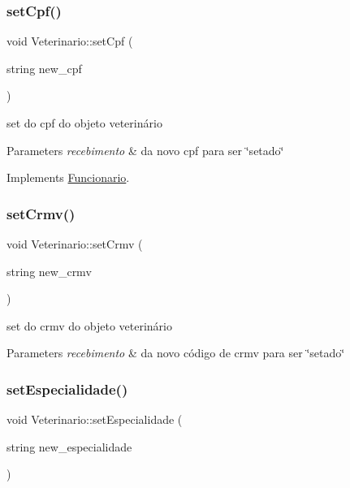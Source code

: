 \subsubsection{\texorpdfstring{setCpf()}{setCpf()}}
{\footnotesize\ttfamily void Veterinario\+::set\+Cpf (\begin{DoxyParamCaption}\item[{string}]{new\+\_\+cpf }\end{DoxyParamCaption})\hspace{0.3cm}{\ttfamily [virtual]}}



set do cpf do objeto veterinário 


\begin{DoxyParams}{Parameters}
{\em recebimento} & da novo cpf para ser \char`\"{}setado\char`\"{} \\
\hline
\end{DoxyParams}


Implements \mbox{\hyperlink{class_funcionario}{Funcionario}}.

\mbox{\label{class_veterinario_a01df797952ad2f6ddafdbd8d1e19c100}} 
\subsubsection{\texorpdfstring{setCrmv()}{setCrmv()}}
{\footnotesize\ttfamily void Veterinario\+::set\+Crmv (\begin{DoxyParamCaption}\item[{string}]{new\+\_\+crmv }\end{DoxyParamCaption})}



set do crmv do objeto veterinário 


\begin{DoxyParams}{Parameters}
{\em recebimento} & da novo código de crmv para ser \char`\"{}setado\char`\"{} \\
\hline
\end{DoxyParams}
\mbox{\label{class_veterinario_a64032de74af72011133d94dea6a49514}} 
\subsubsection{\texorpdfstring{setEspecialidade()}{setEspecialidade()}}
{\footnotesize\ttfamily void Veterinario\+::set\+Especialidade (\begin{DoxyParamCaption}\item[{string}]{new\+\_\+especialidade }\end{DoxyParamCaption})\hspace{0.3cm}{\ttfamily [virtual]}}



